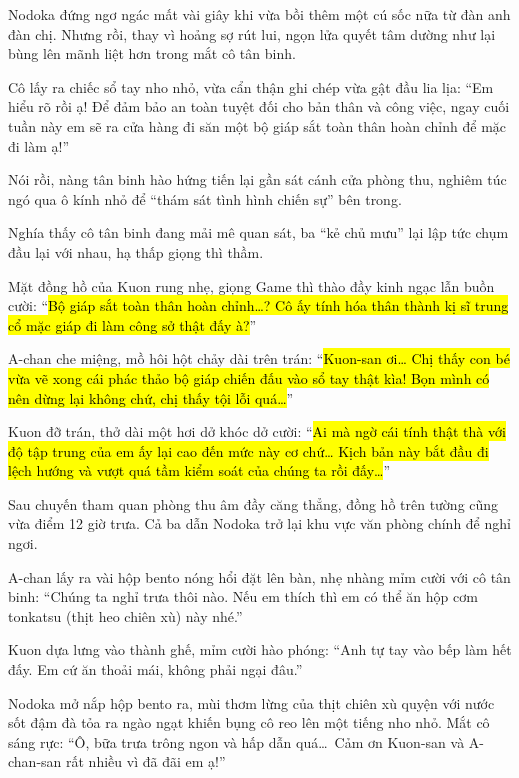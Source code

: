 \documentclass[../main.tex]{subfiles}
\begin{document}
Nodoka đứng ngơ ngác mất vài giây khi vừa bồi thêm một cú sốc nữa từ đàn anh đàn chị. Nhưng rồi, thay vì hoảng sợ rút lui, ngọn lửa quyết tâm dường như lại bùng lên mãnh liệt hơn trong mắt cô tân binh.

Cô lấy ra chiếc sổ tay nho nhỏ, vừa cẩn thận ghi chép vừa gật đầu lia lịa: ``Em hiểu rõ rồi ạ! Để đảm bảo an toàn tuyệt đối cho bản thân và công việc, ngay cuối tuần này em sẽ ra cửa hàng đi săn một bộ giáp sắt toàn thân hoàn chỉnh để mặc đi làm ạ!''

Nói rồi, nàng tân binh hào hứng tiến lại gần sát cánh cửa phòng thu, nghiêm túc ngó qua ô kính nhỏ để ``thám sát tình hình chiến sự'' bên trong.

Nghía thấy cô tân binh đang mải mê quan sát, ba ``kẻ chủ mưu'' lại lập tức chụm đầu lại với nhau, hạ thấp giọng thì thầm.

Mặt đồng hồ của Kuon rung nhẹ, giọng Game thì thào đầy kinh ngạc lẫn buồn cười: ``\hl{Bộ giáp sắt toàn thân hoàn chỉnh\dots? Cô ấy tính hóa thân thành kị sĩ trung cổ mặc giáp đi làm công sở thật đấy à?}''

A-chan che miệng, mồ hôi hột chảy dài trên trán: ``\hl{Kuon-san ơi\dots{} Chị thấy con bé vừa vẽ xong cái phác thảo bộ giáp chiến đấu vào sổ tay thật kìa! Bọn mình có nên dừng lại không chứ, chị thấy tội lỗi quá\dots}''

Kuon đỡ trán, thở dài một hơi dở khóc dở cười: ``\hl{Ai mà ngờ cái tính thật thà với độ tập trung của em ấy lại cao đến mức này cơ chứ\dots{} Kịch bản này bắt đầu đi lệch hướng và vượt quá tầm kiểm soát của chúng ta rồi đấy\dots}''

\ct

Sau chuyến tham quan phòng thu âm đầy căng thẳng, đồng hồ trên tường cũng vừa điểm 12 giờ trưa. Cả ba dẫn Nodoka trở lại khu vực văn phòng chính để nghỉ ngơi.

A-chan lấy ra vài hộp bento nóng hổi đặt lên bàn, nhẹ nhàng mỉm cười với cô tân binh: ``Chúng ta nghỉ trưa thôi nào. Nếu em thích thì em có thể ăn hộp cơm tonkatsu (thịt heo chiên xù) này nhé.''

Kuon dựa lưng vào thành ghế, mỉm cười hào phóng: ``Anh tự tay vào bếp làm hết đấy. Em cứ ăn thoải mái, không phải ngại đâu.''

Nodoka mở nắp hộp bento ra, mùi thơm lừng của thịt chiên xù quyện với nước sốt đậm đà tỏa ra ngào ngạt khiến bụng cô reo lên một tiếng nho nhỏ. Mắt cô sáng rực: ``Ô, bữa trưa trông ngon và hấp dẫn quá\dots\ Cảm ơn Kuon-san và A-chan-san rất nhiều vì đã đãi em ạ!''
\end{document}
